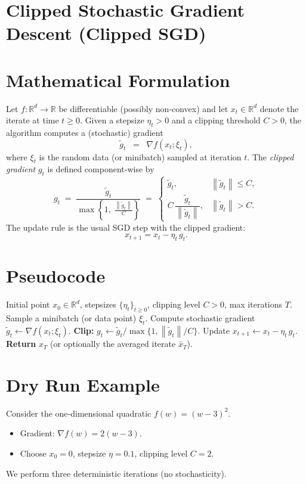 \documentclass{article}
\newcommand{\norm}[1]{\left\lVert #1\right\rVert}
\begin{document}
\section*{Clipped Stochastic Gradient Descent (Clipped SGD)}

\section*{Mathematical Formulation}
Let $f:\mathbb{R}^d\to\mathbb{R}$ be differentiable (possibly non‑convex) and let $x_t\in\mathbb{R}^d$ denote the iterate at time $t\ge 0$.
Given a stepsize $\eta_t>0$ and a clipping threshold $C>0$, the algorithm computes a (stochastic) gradient
\[
\tilde g_t \;\;=\;\; \nabla f(x_t;\xi_t),
\]
where $\xi_t$ is the random data (or minibatch) sampled at iteration $t$.
The \emph{clipped gradient} $g_t$ is defined component‑wise by
\[
g_t \;=\;
\frac{\tilde g_t}{\max\!\left\{1,\;\frac{\norm{\tilde g_t}}{C}\right\}}
\;=\;
\begin{cases}
\tilde g_t, & \norm{\tilde g_t}\le C,\\[4pt]
C\,\dfrac{\tilde g_t}{\norm{\tilde g_t}}, & \norm{\tilde g_t}> C .
\end{cases}
\tag{1}
\]
The update rule is the usual SGD step with the clipped gradient:
\[
x_{t+1}=x_t-\eta_t\,g_t . \tag{2}
\]

\section*{Pseudocode}
\begin{algorithm}[H]
\caption{Clipped SGD}
\begin{algorithmic}[1]
\Require Initial point $x_0\in\mathbb{R}^d$, stepsizes $\{\eta_t\}_{t\ge0}$, clipping level $C>0$, max iterations $T$.
    \State Sample a minibatch (or data point) $\xi_t$.
    \State Compute stochastic gradient $\tilde g_t \gets \nabla f(x_t;\xi_t)$.
    \State \textbf{Clip:} $g_t \gets \tilde g_t/\max\{1,\norm{\tilde g_t}/C\}$.
    \State Update $x_{t+1}\gets x_t-\eta_t\,g_t$.
\EndFor
\State \textbf{Return} $x_T$ (or optionally the averaged iterate $\bar x_T$).
\end{algorithmic}
\end{algorithm}

\section*{Dry Run Example}
Consider the one‑dimensional quadratic $f(w)=(w-3)^2$.
\begin{itemize}
\item Gradient: $\nabla f(w)=2(w-3)$.
\item Choose $x_0=0$, stepsize $\eta=0.1$, clipping level $C=2$.
\end{itemize}
We perform three deterministic iterations (no stochasticity).
\end{document}
